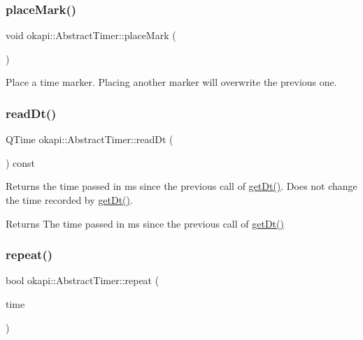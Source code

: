 \subsubsection{\texorpdfstring{placeMark()}{placeMark()}}
{\footnotesize\ttfamily void okapi\+::\+Abstract\+Timer\+::place\+Mark (\begin{DoxyParamCaption}{ }\end{DoxyParamCaption})\hspace{0.3cm}{\ttfamily [virtual]}}

Place a time marker. Placing another marker will overwrite the previous one. \mbox{\label{classokapi_1_1AbstractTimer_a4208d7ef0b828422ba02dfd563306ab1}} 
\subsubsection{\texorpdfstring{readDt()}{readDt()}}
{\footnotesize\ttfamily Q\+Time okapi\+::\+Abstract\+Timer\+::read\+Dt (\begin{DoxyParamCaption}{ }\end{DoxyParamCaption}) const\hspace{0.3cm}{\ttfamily [virtual]}}

Returns the time passed in ms since the previous call of \mbox{\hyperlink{classokapi_1_1AbstractTimer_a6c79c35780dbc4e04e356167bb175424}{get\+Dt()}}. Does not change the time recorded by \mbox{\hyperlink{classokapi_1_1AbstractTimer_a6c79c35780dbc4e04e356167bb175424}{get\+Dt()}}.

\begin{DoxyReturn}{Returns}
The time passed in ms since the previous call of \mbox{\hyperlink{classokapi_1_1AbstractTimer_a6c79c35780dbc4e04e356167bb175424}{get\+Dt()}} 
\end{DoxyReturn}
\mbox{\label{classokapi_1_1AbstractTimer_a452be1d251e938ab4c69801ea2d52e20}} 
\subsubsection{\texorpdfstring{repeat()}{repeat()}\hspace{0.1cm}{\footnotesize\ttfamily [1/2]}}
{\footnotesize\ttfamily bool okapi\+::\+Abstract\+Timer\+::repeat (\begin{DoxyParamCaption}\item[{Q\+Time}]{time }\end{DoxyParamCaption})\hspace{0.3cm}{\ttfamily [virtual]}}

